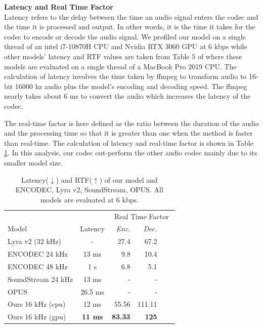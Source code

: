 \documentclass[12pt]{report}
\begin{document}
\newpage
\raggedright
\textbf{Latency and Real Time Factor} \\
Latency refers to the delay between the time an audio signal enters the codec and the time it is processed and output. In other words, it is the time it takes for the codec to encode or decode the audio signal. We profiled our model on a single thread of an intel i7-10870H CPU and Nvidia RTX 3060 GPU at 6 kbps while other models' latency and RTF values are taken from Table 5 of \cite{defossez2022high} where these models are evaluated on a single thread of a MacBook Pro 2019 CPU. The calculation of latency involves the time taken by ffmpeg to transform audio to 16-bit 16000 hz audio plus the model's encoding and decoding speed. The ffmpeg nearly takes about 6 ms to convert the audio which increases the latency of the codec.

The real-time factor is here defined as the ratio between the duration of the audio and the processing time so that it is greater than one when the method is faster than real-time. The calculation of latency and real-time factor is shown in Table \ref{tab:latencycomp}. In this analysis, our codec out-perform the other audio codec mainly due to its smaller model size. 



\begin{table}[H]
\captionsetup{singlelinecheck=false, font=small}
\caption{Latency($\downarrow$) and RTF($\uparrow$) of our model and ENCODEC, Lyra v2, SoundStream, OPUS. All models are evaluated at 6 kbps.}
\renewcommand{\arraystretch}{1.5}
\setlength{\tabcolsep}{12pt}
  \centering
  \begin{tabular}{lcrrrr}
  \hline
    & & \multicolumn{4}{c}{Real Time Factor}\\
    Model & Latency & \emph{Enc.} & \emph{Dec.}  \\
    \hline
    Lyra v2 (32 kHz) & - & 27.4 & 67.2 \\
    \hline
    ENCODEC 24 kHz & 13 ms & 9.8 & 10.4 \\
    ENCODEC 48 kHz & 1 s & 6.8 & 5.1 & \\
    \hline
    SoundStream 24 kHz & 13 ms & - & - \\
    \hline 
    OPUS  & 26.5 ms & - & - \\
    \hline
    Ours 16 kHz (cpu)  & 12 ms & 55.56 & 111.11 \\
    Ours 16 kHz (gpu)  & \textbf{11 ms} & \textbf{83.33} & \textbf{125} \\
    \hline
    \end{tabular}
\label{tab:latencycomp}
\end{table}
\end{document}

